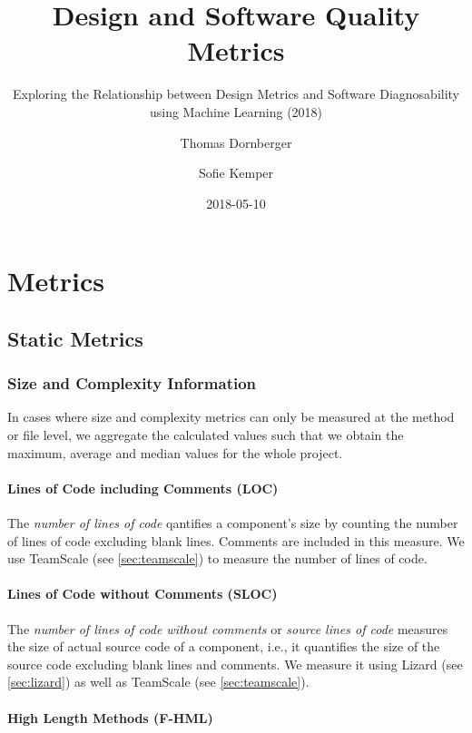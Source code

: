 \documentclass{scrartcl}
\begin{document}
\title{Design and Software Quality Metrics}
\subtitle{Exploring the Relationship between Design Metrics and Software
Diagnosability using Machine Learning (2018)}
\author{Thomas Dornberger \and Sofie Kemper}
\date{2018-05-10}

\maketitle

\section{Metrics}

\subsection{Static Metrics}

\subsubsection{Size and Complexity Information}

In cases where size and complexity metrics can only be measured at the method or
file level, we aggregate the calculated values such that we obtain the maximum,
average and median values for the whole project.

\paragraph{Lines of Code including Comments (LOC)}

The \emph{number of lines of code} qantifies a component's size by counting the
number of lines of code excluding blank lines. Comments are included in this
measure. We use TeamScale (see \ref{sec:teamscale}) to measure the number of
lines of code.

\paragraph{Lines of Code without Comments (SLOC)}

The \emph{number of lines of code without comments} or \emph{source lines of
code} measures the size of actual
source code of a component, i.e., it quantifies the size of the source code
excluding blank lines and comments. We measure it using Lizard (see
\ref{sec:lizard}) as well as TeamScale (see \ref{sec:teamscale}).

\paragraph{High Length Methods (F-HML)}
\end{document}
